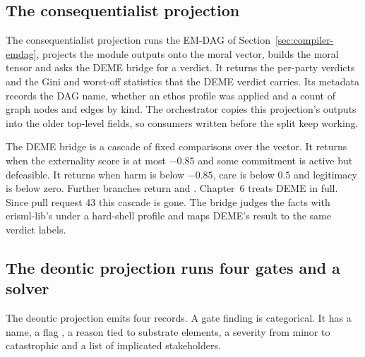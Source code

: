 \subsection{The consequentialist projection}

The consequentialist projection runs the EM-DAG of Section~\ref{sec:compiler-emdag}, projects
the module outputs onto the moral vector, builds the moral tensor and asks the DEME bridge for a
verdict. It returns the per-party verdicts and the Gini and worst-off statistics that the DEME
verdict carries. Its metadata records the DAG name, whether an ethos profile was applied and a
count of graph nodes and edges by kind. The orchestrator copies this projection's outputs into
the older top-level fields, so consumers written before the split keep working.

The DEME bridge is a cascade of fixed comparisons over the vector. It returns
 when the externality score is at most $-0.85$ and some
commitment is active but defeasible. It returns  when harm is below $-0.85$,
care is below $0.5$ and legitimacy is below zero. Further branches return
 and . Chapter~6 treats DEME in full.
Since pull request 43 this cascade is gone. The bridge judges the facts with
erisml-lib's  under a hard-shell profile and maps DEME's result to the same
verdict labels.

\subsection{The deontic projection runs four gates and a solver}

The deontic projection emits four  records. A gate finding is categorical. It
has a name, a flag , a reason tied to substrate elements, a severity from minor to
catastrophic and a list of implicated stakeholders.

